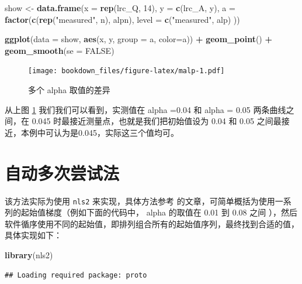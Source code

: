 \documentclass[
]{krantz}
\makeatletter
\newenvironment{Shaded}{\begin{snugshade}}{\end{snugshade}}
\newcommand{\DataTypeTok}[1]{\textcolor[rgb]{0.13,0.29,0.53}{#1}}
\newcommand{\DecValTok}[1]{\textcolor[rgb]{0.00,0.00,0.81}{#1}}
\newcommand{\KeywordTok}[1]{\textcolor[rgb]{0.13,0.29,0.53}{\textbf{#1}}}
\newcommand{\NormalTok}[1]{#1}
\newcommand{\OperatorTok}[1]{\textcolor[rgb]{0.81,0.36,0.00}{\textbf{#1}}}
\newcommand{\OtherTok}[1]{\textcolor[rgb]{0.56,0.35,0.01}{#1}}
\newcommand{\StringTok}[1]{\textcolor[rgb]{0.31,0.60,0.02}{#1}}
\newenvironment{kframe}{%
\medskip{}
\setlength{\fboxsep}{.8em}
 \def\at@end@of@kframe{}%
 \ifinner\ifhmode%
  \def\at@end@of@kframe{\end{minipage}}%
  \begin{minipage}{\columnwidth}%
 \fi\fi%
 \def\FrameCommand##1{\hskip\@totalleftmargin \hskip-\fboxsep
 \colorbox{shadecolor}{##1}\hskip-\fboxsep
     \hskip-\linewidth \hskip-\@totalleftmargin \hskip\columnwidth}%
 \MakeFramed {\advance\hsize-\width
   \@totalleftmargin\z@ \linewidth\hsize
   \@setminipage}}%
 {\par\unskip\endMakeFramed%
 \at@end@of@kframe}
\renewenvironment{Shaded}{\begin{kframe}}{\end{kframe}}
\makeatother
\begin{document}
\begin{Shaded}
\begin{Highlighting}[]
\NormalTok{show \textless{}{-}}\StringTok{ }\KeywordTok{data.frame}\NormalTok{(}\DataTypeTok{x =} \KeywordTok{rep}\NormalTok{(lrc\_Q, }\DecValTok{14}\NormalTok{),}
           \DataTypeTok{y =} \KeywordTok{c}\NormalTok{(lrc\_A, y), }
           \DataTypeTok{a =} \KeywordTok{factor}\NormalTok{(}\KeywordTok{c}\NormalTok{(}\KeywordTok{rep}\NormalTok{(}\StringTok{"measured"}\NormalTok{, n), alpn),}
           \DataTypeTok{level =} \KeywordTok{c}\NormalTok{(}\StringTok{"measured"}\NormalTok{, alp)}
\NormalTok{             ))}

\KeywordTok{ggplot}\NormalTok{(}\DataTypeTok{data =}\NormalTok{ show, }\KeywordTok{aes}\NormalTok{(x, y, }\DataTypeTok{group =}\NormalTok{ a, }\DataTypeTok{color=}\NormalTok{a)) }\OperatorTok{+}\StringTok{ }
\StringTok{  }\KeywordTok{geom\_point}\NormalTok{() }\OperatorTok{+}\StringTok{ }
\StringTok{  }\KeywordTok{geom\_smooth}\NormalTok{(}\DataTypeTok{se =} \OtherTok{FALSE}\NormalTok{) }
\end{Highlighting}
\end{Shaded}

\begin{figure}
\centering
\texttt{[image: bookdown\_files/figure-latex/malp-1.pdf]}
\caption{\label{fig:malp}多个 alpha 取值的差异}
\end{figure}

从上图 \ref{fig:malp} 我们我们可以看到，实测值在 alpha =0.04 和 alpha = 0.05 两条曲线之间，在 0.045 时最接近测量点，也就是我们把初始值设为 0.04 和 0.05 之间最接近，本例中可认为是0.045，实际这三个值均可。

\hypertarget{mult_try}{%
\section{自动多次尝试法}\label{mult_try}}

该方法实际为使用 \texttt{nls2} 来实现，具体方法参考 \citet{nls2} 的文章，可简单概括为使用一系列的起始值梯度（例如下面的代码中， alpha 的取值在 0.01 到 0.08 之间 ），然后软件循序使用不同的起始值，即排列组合所有的起始值序列，最终找到合适的值，具体实现如下：

\begin{Shaded}
\begin{Highlighting}[]
\KeywordTok{library}\NormalTok{(nls2)}
\end{Highlighting}
\end{Shaded}

\begin{verbatim}
## Loading required package: proto
\end{verbatim}
\end{document}
